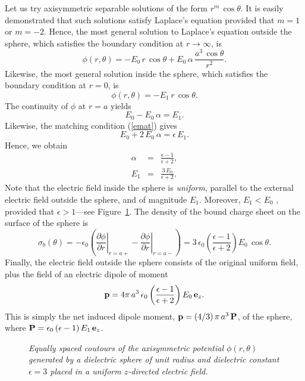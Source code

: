 Let us try axisymmetric separable solutions of the form $r^m\,\cos\theta$. It is
easily demonstrated that such solutions satisfy Laplace's equation
provided that $m=1$ or $m=-2$. Hence, the most general solution to Laplace's equation outside
the sphere, which satisfies the boundary condition at $r\rightarrow\infty$, is
\begin{equation}
\phi(r,\theta) = - E_0\,r\,\cos\theta + E_0\,\alpha \,\frac{a^3\,\cos\theta}{r^2}.
\end{equation}
Likewise, the most general solution inside the sphere, which satisfies
the boundary condition at $r=0$, is
\begin{equation}
\phi(r,\theta) = - E_1\,r\,\cos\theta.
\end{equation}
The continuity of $\phi$ at $r=a$ yields
\begin{equation}
E_0 - E_0\,\alpha = E_1.
\end{equation}
Likewise, the matching condition (\ref{emat}) gives
\begin{equation}
E_0 + 2\,E_0\,\alpha = \epsilon\,E_1.
\end{equation}
Hence, we obtain
\begin{eqnarray}
\alpha &=& \frac{\epsilon-1}{\epsilon+2},\\[0.5ex]
E_1 &=& \frac{3\,E_0}{\epsilon+2}.\label{e5.48x}
\end{eqnarray}
Note that the electric field inside the sphere is {\em uniform}, parallel
to the external electric field outside the sphere, and of magnitude $E_1$. Moreover, $E_1 < E_0$ , provided that $\epsilon>1$---see Figure~\ref{fex6}.
The density of the bound charge sheet on the surface of the sphere
is
\begin{equation}
\sigma_b(\theta) = -\epsilon_0\left(\left.\frac{\partial\phi}{\partial r}\right|_{r=a+}
-\left.\frac{\partial\phi}{\partial r}\right|_{r=a-}\right) = 
3\,\epsilon_0\left(\frac{\epsilon-1}{\epsilon+2}\right)E_0\,\cos\theta.
\end{equation}
Finally, the electric field outside the sphere consists of the original
uniform field, plus the field of an electric dipole of moment
\begin{equation}
{\bf p} = 4\pi\,a^3\,\epsilon_0\left(\frac{\epsilon-1}{\epsilon+2}\right)E_0\,{\bf e}_z.
\end{equation}
This is simply the net induced  dipole moment, ${\bf p} = (4/3)\,\pi\,a^3\,{\bf P}$, of
the sphere, where ${\bf P} = \epsilon_0\,(\epsilon-1)\,E_1\,{\bf e}_z$. 
\begin{figure}
\centerline{}
\caption{\em Equally spaced coutours of the axisymmetric potential
$\phi(r,\theta)$ generated by a dielectric sphere of unit radius and dielectric constant $\epsilon=3$ placed in a uniform $z$-directed electric field.}\label{fex6}
\end{figure}

